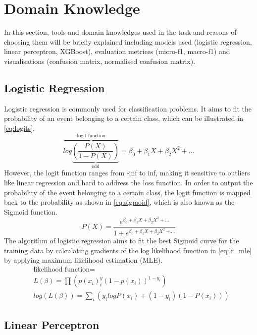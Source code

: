 \documentclass[10pt, a4paper, twocolumn]{article} %
\begin{document}
\section{Domain Knowledge}\label{sec:domain_knowledge}
In this section, tools and domain knowledges used in the task and reasons of choosing them  will be 
briefly explained including models used (logistic regression, linear perceptron, XGBoost), evaluation metrices 
(micro-f1, macro-f1) and visualisations (confusion matrix, normalised confusion matrix).
\subsection{Logistic Regression}
Logistic regression is commonly used for classification problems. It aims to fit the probability of an event 
belonging to a certain class, which can be illustrated in \autoref{eq:logits}.
\begin{equation}\label{eq:logits}
	\overbrace{log\underbrace{\left(\frac{P(X)}{1-P(X)}\right)}_\text{odd}}^\text{logit function} = \beta_0 + \beta_1X + \beta_2X^2 +...
\end{equation}
However, the logit function ranges from -inf to inf, making it sensitive to outliers like linear regression and hard to address 
the loss function. In order to output the probability of the event belonging to a certain class, the logit function is mapped 
back to the probability as shown in \autoref{eq:sigmoid}, which is also known as the Sigmoid function.
\begin{equation}\label{eq:sigmoid}
	P(X) = \frac{e^{\beta_0 + \beta_1X + \beta_2X^2 +...}}{1+e^{\beta_0 + \beta_1X + \beta_2X^2 +...}}
\end{equation}
The algorithm of logistic regression aims to fit the best Sigmoid curve for the training data by calculating gradients of the 
log likelihood function in \autoref{eq:lr_mle} by applying maximum likelihood estimation (MLE).
\begin{equation}\label{eq:lr_mle}
\begin{split}
	& \text{likelihood function} = \\
	& L(\beta) = \prod\left(p(x_i)^y_i(1-p(x_i))^{1-y_i}\right)\\
	&log(L(\beta)) = \sum_i\left(y_ilogP(x_i)+(1-y_i)(1-P(x_i))\right)
\end{split}
\end{equation}
\subsection{Linear Perceptron}
\end{document}
